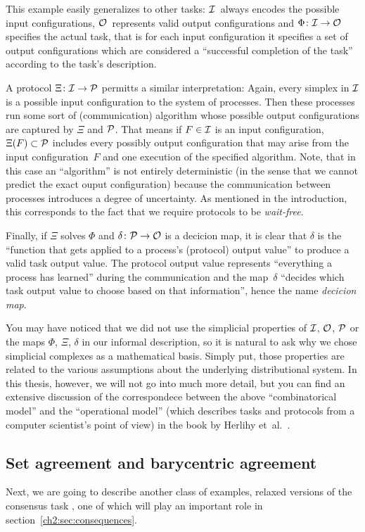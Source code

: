 This example easily generalizes to other tasks:
$\mathcal{I}$~always encodes the possible input configurations,
$\mathcal{O}$~represents valid output configurations and
$\Phi\colon\mathcal{I}\to\mathcal{O}$ specifies the actual task, that is
for each input configuration it specifies a set of output
configurations which are considered a \enquote{successful
completion of the task} according to the task's description.

A protocol $\Xi\colon\mathcal{I}\to\mathcal{P}$ permitts a similar interpretation:
Again, every simplex in $\mathcal{I}$ is a possible input configuration to
the system of processes. Then these processes run some sort of
(communication) algorithm whose possible output configurations are
captured by $\Xi$ and $\mathcal{P}$. That means if $F\in\mathcal{I}$ is an input
configuration, $\Xi(F) \subset \mathcal{P}$ includes every possibly output
configuration that may arise from the input configuration~$F$ and
one execution of the specified algorithm. Note, that in this case
an \enquote{algorithm} is not entirely deterministic (in the sense
that we cannot predict the exact ouput configuration) because the
communication between processes introduces a degree of uncertainty.
As mentioned %
in the introduction, this corresponds to the fact that we require
protocols to be \emph{wait-free}.

Finally, if $\Xi$ solves $\Phi$ and $\delta\colon\mathcal{P}\to\mathcal{O}$ is a decicion
map, it is clear that $\delta$ is the \enquote{function that gets applied
to a process's (protocol) output value} to produce a valid task
output value. The protocol output value represents \enquote{everything
a process has learned} during the communication and the map~$\delta$
\enquote{decides which task output value to choose based on that
information}, hence the name \emph{decicion map}.

You may have noticed that we did not use the simplicial properties of
$\mathcal{I}$, $\mathcal{O}$, $\mathcal{P}$ or the maps $\Phi$, $\Xi$, $\delta$ in our
informal description, so it is natural to ask why we chose simplicial
complexes as a mathematical basis. Simply put, those properties are
related to the various assumptions about the underlying distributional
system. In this thesis, however, we will not go into much more detail,
but you can find an extensive discussion of the correspondece between
the above \enquote{combinatorical model} and the \enquote{operational
model} (which describes tasks and protocols from a computer
scientist's point of view) in the book by
Herlihy et~al.~\cite[Ch.\,4]{bookc:herlihyetal13}.

\subsection{Set agreement and barycentric agreement}
Next, we are going to describe another class of examples, relaxed versions of
the consensus task , one of which will play an important
role in section~\ref{ch2:sec:consequences}.

